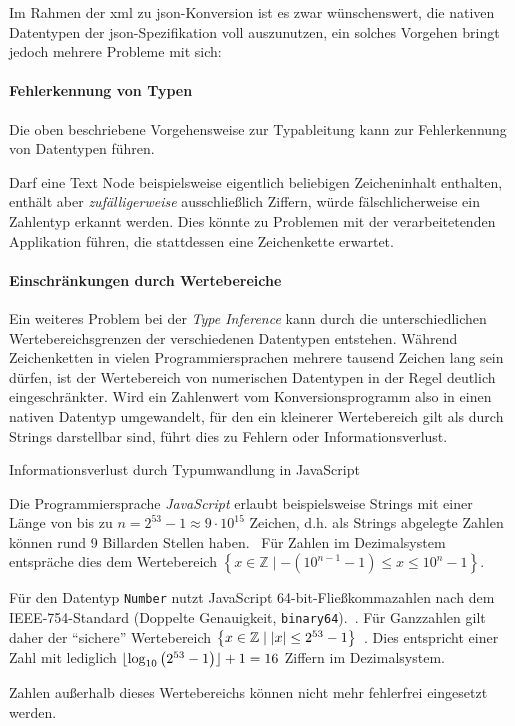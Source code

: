 Im Rahmen der \acrshort{xml} zu \acrshort{json}-Konversion ist es zwar wünschenswert, die nativen Datentypen der \acrshort{json}-Spezifikation voll auszunutzen, ein solches Vorgehen bringt jedoch mehrere Probleme mit sich:

\paragraph{Fehlerkennung von Typen}

Die oben beschriebene Vorgehensweise zur Typableitung kann zur Fehlerkennung von Datentypen führen.

Darf eine Text Node beispielsweise eigentlich beliebigen Zeicheninhalt enthalten, enthält aber \emph{zufälligerweise} ausschließlich Ziffern, würde fälschlicherweise ein Zahlentyp erkannt werden. Dies könnte zu Problemen mit der verarbeitetenden Applikation führen, die stattdessen eine Zeichenkette erwartet.

\paragraph{Einschränkungen durch Wertebereiche}

Ein weiteres Problem bei der \emph{Type Inference} kann durch die unterschiedlichen Wertebereichsgrenzen der verschiedenen Datentypen entstehen.  Während Zeichenketten in vielen Programmiersprachen mehrere tausend Zeichen lang sein dürfen, ist der Wertebereich von numerischen Datentypen in der Regel deutlich eingeschränkter. Wird ein Zahlenwert vom Konversionsprogramm also in einen nativen Datentyp umgewandelt, für den ein kleinerer Wertebereich gilt als durch Strings darstellbar sind, führt dies zu Fehlern oder Informationsverlust.

\begin{example} Informationsverlust durch Typumwandlung in JavaScript

    Die Programmiersprache \emph{JavaScript} erlaubt beispielsweise Strings mit einer Länge von bis zu $n=2^{53}-1 \approx 9 \cdot 10^{15}$ Zeichen, d.h. als Strings abgelegte Zahlen können rund 9 Billarden Stellen haben.~\cite[Abschnitt 6.1.4]{ecma262} Für Zahlen im Dezimalsystem entspräche dies dem Wertebereich $\left\{x \in \mathbb{Z} \mid -\left(10^{n-1}-1\right) \leq x \leq 10^{n}-1\right\}$.

    Für den Datentyp \texttt{Number} nutzt JavaScript 64-bit-Fließkommazahlen nach dem IEEE-754-Standard (Doppelte Genauigkeit, \texttt{binary64}).~\cite[Abschnitt 4.3.20]{ecma262}. Für Ganzzahlen gilt daher der \enquote{sichere} Wertebereich $\left\{x \in \mathbb{Z} \mid \lvert x\rvert \leq 2^{53}-1\right\}$~\cite[Abschnitt 20.1.2.5]{ecma262}. Dies entspricht einer Zahl mit lediglich $\lfloor\log_{10}\left(2^{53}-1\right)\rfloor+1 = 16$ Ziffern im Dezimalsystem.

    Zahlen außerhalb dieses Wertebereichs können nicht mehr fehlerfrei eingesetzt werden.

    \inputminted[firstline=2,firstnumber=1,mathescape]{javascript}{typeinference.js}
\end{example}

